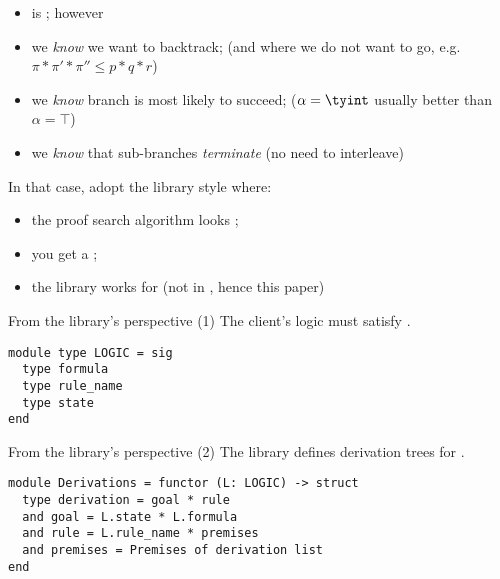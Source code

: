 \documentclass[final,xetex]{beamer}
\begin{document}
\begin{frame}[plain]
  \backupslide
\end{frame}

\begin{frame}{}
  \begin{itemize}
    \item \mezzo is ; however
    \item we \emph{know}  we want to backtrack;
      {\tiny(and where we do not want to go, e.g. $\pi \ast \pi' \ast \pi'' \leq p \ast q \ast r$)}
    \item we \emph{know}  branch is most likely to succeed;
      {\tiny($\alpha = \tyint$ usually better than $\alpha = \top$)}
    \item we \emph{know} that sub-branches \emph{terminate}
      {\tiny(no need to interleave)}
  \end{itemize}
\end{frame}

\begin{frame}{}
  In that case, adopt the library style where:
  \begin{itemize}
    \item the proof search algorithm looks ;
    \item you get a ;
    \item the library works for  {\tiny(not in \mezzo, hence this
      paper)}
  \end{itemize}
\end{frame}

\begin{frame}[plain]
  \backupslide
\end{frame}

\begin{frame}[fragile]{From the library's perspective (1)}
  The client's logic must satisfy .

  \bigskip

  \begin{verbatim}
module type LOGIC = sig
  type formula
  type rule_name
  type state
end
  \end{verbatim}
\end{frame}

\begin{frame}[fragile]{From the library's perspective (2)}
  The library defines derivation trees for .

  \bigskip

  \begin{verbatim}
module Derivations = functor (L: LOGIC) -> struct
  type derivation = goal * rule
  and goal = L.state * L.formula
  and rule = L.rule_name * premises
  and premises = Premises of derivation list
end
  \end{verbatim}
\end{frame}
\end{document}
